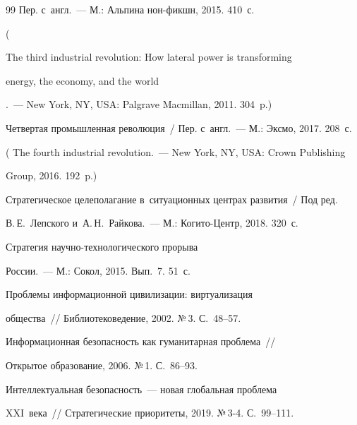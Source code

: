 {{\begin{thebibliography}{99}
Пер. с~англ.~---  М.: Альпина нон-фикшн, 2015. 410~с. 


( {The third industrial revolution: How lateral power is transforming 


energy, the economy, and the world}.~--- New York, NY, USA: Palgrave Macmillan, 2011. 304~p.)




 Четвертая промышленная революция~/ Пер. с~англ.~--- М.: Эксмо, 2017. 208~с.


( {The fourth industrial revolution}.~--- New York, NY, USA: Crown Publishing 


Group, 2016. 192~p.)




Стратегическое целеполагание в~ситуационных цент\-рах развития~/ Под ред.\ 


В.\,Е.~Лепского и~А.\,Н.~Райкова.~--- М.: Когито-Центр, 2018. 320~с.




 Стратегия на\-уч\-но-тех\-но\-ло\-ги\-че\-ско\-го прорыва 


России.~--- М.: Сокол, 2015. Вып.~7. 51~с. 




 Проблемы информационной цивилизации: вир\-ту\-а\-ли\-за\-ция 


общества~/\!\!/ Биб\-лио\-те\-ко\-ве\-де\-ние, 2002. №\,3. С.~48--57.







 Информационная безопас\-ность как гуманитарная проб\-ле\-ма~/\!\!/ 


Открытое образование, 2006. №\,1. С.~86--93.







 Интеллектуальная безопас\-ность~--- новая глобальная проб\-ле\-ма 


XXI~века~/\!\!/ Стратегические приоритеты, 2019. №\,3-4. С.~99--111.





 \end{thebibliography}


} }











